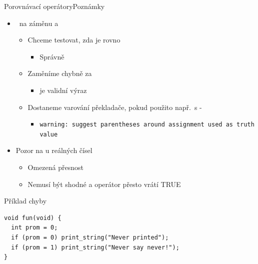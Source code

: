 \begin{frame}[fragile]{Porovnávací operátory}{Poznámky}

  \begin{itemize}
    \item \pozor\ na záměnu \code{=} a \code{==}
    \begin{itemize}
      \item Chceme testovat, zda je  rovno 
      \begin{itemize}
	\item Správně 
      \end{itemize}

      \pause

      \item Zaměníme chybně \code{==} za \code{=}
      \begin{itemize}
	\item {} je validní výraz
      \end{itemize}

      \pause

      \item Dostaneme varování překladače, pokud použito např.\ s
        -
      \begin{itemize}
	\item \tinyL \texttt{warning: suggest parentheses around assignment
	  used as truth value}
      \end{itemize}

    \end{itemize}

    \pause

    \item Pozor na \code{==} u reálných čísel
    \begin{itemize}
      \item Omezená přesnost
      \item Nemusí být shodné a operátor přesto vrátí TRUE
    \end{itemize}
  \end{itemize}


  \begin{block}{Příklad chyby}
  \begin{lstlisting}
void fun(void) {
  int prom = 0;
  if (prom = 0) print_string("Never printed");
  if (prom = 1) print_string("Never say never!");
}
  \end{lstlisting}
  \end{block}

\end{frame}

